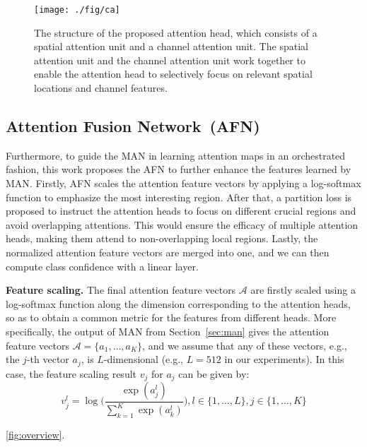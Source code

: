 \documentclass{article}
\begin{document}
\begin{figure}[]
\centering
{\texttt{[image: ./fig/ca]}}
\caption{The structure of the proposed attention head, which consists of a spatial attention unit and a channel attention unit. The spatial attention unit and the channel attention unit work together to enable the attention head to selectively focus on relevant spatial locations and channel features.}
\label{fig:ca}

\end{figure}

\subsection{Attention Fusion Network~(AFN)}
Furthermore, to guide the MAN in learning attention maps in an orchestrated fashion, this work proposes the AFN to further enhance the features learned by MAN.
Firstly, AFN scales the {attention feature vectors} by applying a log-softmax function to emphasize the most interesting region. After that, a partition loss is proposed to instruct the attention heads to focus on different crucial regions and avoid overlapping attentions. This would ensure the efficacy of multiple attention heads, making them attend to non-overlapping local regions. Lastly, the normalized {attention feature vectors} are merged into one, and we can then compute class confidence with a linear layer. 



\noindent\textbf{{Feature scaling.}} {The final attention feature vectors $\mathcal{A}$ are firstly scaled using a log-softmax function along the dimension corresponding to the attention heads, so as to obtain a common metric for the features from different heads. More specifically, the output of MAN from Section}~\ref{sec:man} {gives the attention feature vectors $\mathcal{A} = \{ a_1, \ldots ,a_K\}$, and we assume that any of these vectors, e.g., the $j$-th vector $a_j$, is $L$-dimensional (e.g., $L=512$ in our experiments). In this case, the feature scaling result $v_j$ for $a_j$ can be given by:}
\begin{equation}
    v_{j}^{l} = \log\Big(\frac{\exp({a_{j}^{l}})}{\sum_{k=1}^{K} \exp(a_{k}^{l})}\Big),  l\in\{1, \ldots ,L\},  j\in\{1, \ldots ,K\}
\end{equation}

\ref{fig:overview}.
\end{document}
